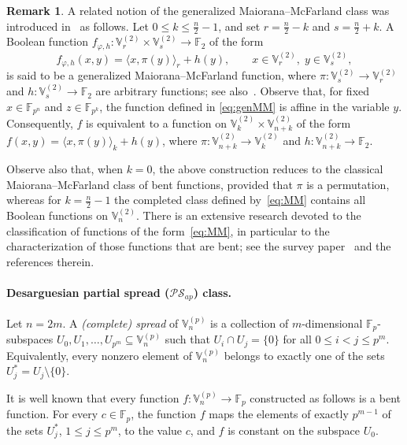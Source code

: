 \documentclass[12pt]{article}
\theoremstyle{plain}
\theoremstyle{definition}
\newtheorem{remark}{Remark}
\newcommand{\V}{\mathbb{V}}
\renewcommand{\to}{\rightarrow}
\begin{document}
	\begin{remark}
		A related notion of the generalized Maiorana--McFarland class was introduced
		in~\cite[Section~4.3]{Camion92} as follows. Let
		\(0 \le k \le \tfrac{n}{2}-1\), and set \(r = \tfrac{n}{2} - k\) and
		\(s = \tfrac{n}{2} + k\). A Boolean function $f_{\varphi,h} \colon \V_r^{(2)} \times \V_s^{(2)} \to \mathbb{F}_2$
		of the form
		\begin{equation}\label{eq:MM}
			f_{\varphi,h}(x,y) = \langle x , \pi(y) \rangle_r + h(y),
			\qquad x \in \V_r^{(2)},\; y \in \V_s^{(2)},
		\end{equation}
		is said to be a generalized Maiorana--McFarland function, where
		\(\pi \colon \V_s^{(2)} \to \V_r^{(2)}\) and
		\(h \colon \V_s^{(2)} \to \mathbb{F}_2\) are arbitrary functions;
		see also~\cite{Carlet2004}. Observe that, for fixed $x \in \mathbb{F}_{p^n}$ and $z \in \mathbb{F}_{p^k}$, 
		the function defined in \eqref{eq:genMM} is affine in the variable $y$. 
		Consequently, $f$ is equivalent to a function on $\V_{k}^{(2)} \times\V_{n+k}^{(2)}$
		of the form $f(x,y) = \langle x , \pi(y) \rangle_k + h(y)$,
		where $\pi \colon \V_{n+k}^{(2)} \to \V_k^{(2)}$ and 
		$h \colon \V_{n+k}^{(2)} \to \mathbb{F}_2$.
		
		Observe also that, when $k = 0$, the above construction reduces to the classical Maiorana--McFarland class of bent functions, provided that $\pi$ is a permutation, whereas for
		\(k = \tfrac{n}{2}-1\) the completed class defined by~\eqref{eq:MM} contains all Boolean
		functions on \(\V_n^{(2)}\).
		There is an extensive research devoted to the classification of functions
		of the form~\eqref{eq:MM}, in particular to the characterization of those
		functions that are bent; see the survey paper~\cite{Pasalic26} and the
		references therein.
	\end{remark}
	
	\paragraph{Desarguesian partial spread (\(\mathcal{PS}_{ap}\)) class.}
	Let \(n = 2m\).
	A \emph{(complete) spread} of \(\V_n^{(p)}\) is a collection of
	\(m\)-dimensional \(\mathbb{F}_p\)-subspaces
	\(U_0, U_1, \dots, U_{p^m} \subseteq \V_n^{(p)}\)
	such that $U_i \cap U_j = \{0\}$ for all $0 \le i < j \le p^m$.
	Equivalently, every nonzero element of \(\V_n^{(p)}\) belongs to exactly one of
	the sets \(U_j^{\ast} = U_j \setminus \{0\}\).
	
	It is well known that every function
	\( f : \V_n^{(p)} \to \mathbb{F}_p \)
	constructed as follows is a bent function. For every \( c \in \mathbb{F}_p \),
	the function \( f \) maps the elements of exactly \( p^{m-1} \) of the sets
	\( U_j^{\ast} \), \( 1 \le j \le p^{m} \), to the value \( c \),
	and \( f \) is constant on the subspace \( U_0 \).
	
\end{document}
